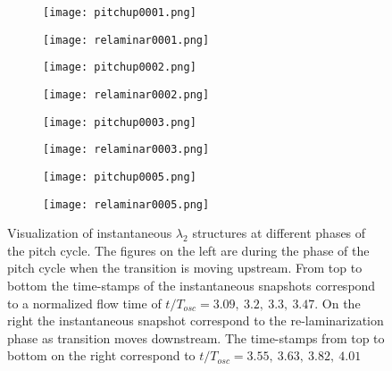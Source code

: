 \begin{figure}
	\centering
	\begin{subfigure}[t]{0.48\textwidth}
		\centering
		\texttt{[image: pitchup0001.png]}
		\label{fig:pitchup_1}
	\end{subfigure}
	\begin{subfigure}[t]{0.48\textwidth}
		\centering
		\texttt{[image: relaminar0001.png]}
		\label{fig:relaminar_1}
	\end{subfigure}
	\begin{subfigure}[t]{0.49\textwidth}
		\centering
		\texttt{[image: pitchup0002.png]}
		\label{fig:pitchup_2}
	\end{subfigure}
	\begin{subfigure}[t]{0.49\textwidth}
		\centering
		\texttt{[image: relaminar0002.png]}
		\label{fig:relaminar_2}
	\end{subfigure}
	\begin{subfigure}[t]{0.49\textwidth}
		\centering
		\texttt{[image: pitchup0003.png]}
		\label{fig:pitchup_3}
	\end{subfigure}
	\begin{subfigure}[t]{0.49\textwidth}
		\centering
		\texttt{[image: relaminar0003.png]}
		\label{fig:relaminar_3}
	\end{subfigure}
	\begin{subfigure}[t]{0.49\textwidth}
		\centering
		\texttt{[image: pitchup0005.png]}
		\label{fig:pitchup_4}
	\end{subfigure}
	\begin{subfigure}[t]{0.49\textwidth}
		\centering
		\texttt{[image: relaminar0005.png]}
		\label{fig:relaminar_4}
	\end{subfigure}	
	\caption{Visualization of instantaneous $\lambda_{2}$ structures at different phases of the pitch cycle. The figures on the left are during the phase of the pitch cycle when the transition is moving upstream. From top to bottom the time-stamps of the instantaneous snapshots correspond to a normalized flow time of $t/T_{osc}=3.09,\ 3.2,\ 3.3,\ 3.47$. On the right the instantaneous snapshot correspond to the re-laminarization phase as transition moves downstream. The time-stamps from top to bottom on the right correspond to $t/T_{osc}=3.55,\ 3.63,\ 3.82,\ 4.01$}
	\label{fig:transition_la2}
\end{figure}

